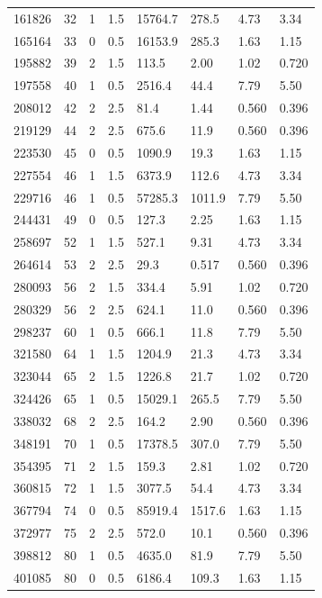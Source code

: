 \documentclass[preview]{standalone}
\begin{document}
{{\begin{tabular}{L{1.2cm}C{1.2cm} C{0.3cm}C{0.5cm} C{1.4cm}C{1.4cm} C{1.4cm}C{1.4cm}}
  161826  &    32  & 1     & 1.5 &  15764.7  & 278.5  & 4.73 &  3.34   \\ 
  165164  &    33  & 0     & 0.5 &  16153.9  & 285.3  & 1.63 &  1.15   \\ 
  195882  &    39  & 2     & 1.5 &  113.5  & 2.00  & 1.02 &  0.720   \\ 
  197558  &    40  & 1     & 0.5 &  2516.4  & 44.4  & 7.79 &  5.50   \\ 
  208012  &    42  & 2     & 2.5 &  81.4  & 1.44  & 0.560 &  0.396   \\ 
  219129  &    44  & 2     & 2.5 &  675.6  & 11.9  & 0.560 &  0.396   \\ 
  223530  &    45  & 0     & 0.5 &  1090.9  & 19.3  & 1.63 &  1.15   \\ 
  227554  &    46  & 1     & 1.5 &  6373.9  & 112.6  & 4.73 &  3.34   \\ 
  229716  &    46  & 1     & 0.5 &  57285.3  & 1011.9  & 7.79 &  5.50   \\ 
  244431  &    49  & 0     & 0.5 &  127.3  & 2.25  & 1.63 &  1.15   \\ 
  258697  &    52  & 1     & 1.5 &  527.1  & 9.31  & 4.73 &  3.34   \\ 
  264614  &    53  & 2     & 2.5 &  29.3  & 0.517  & 0.560 &  0.396   \\ 
  280093  &    56  & 2     & 1.5 &  334.4  & 5.91  & 1.02 &  0.720   \\ 
  280329  &    56  & 2     & 2.5 &  624.1  & 11.0  & 0.560 &  0.396   \\ 
  298237  &    60  & 1     & 0.5 &  666.1  & 11.8  & 7.79 &  5.50   \\ 
  321580  &    64  & 1     & 1.5 &  1204.9  & 21.3  & 4.73 &  3.34   \\ 
  323044  &    65  & 2     & 1.5 &  1226.8  & 21.7  & 1.02 &  0.720   \\ 
  324426  &    65  & 1     & 0.5 &  15029.1  & 265.5  & 7.79 &  5.50   \\ 
  338032  &    68  & 2     & 2.5 &  164.2  & 2.90  & 0.560 &  0.396   \\ 
  348191  &    70  & 1     & 0.5 &  17378.5  & 307.0  & 7.79 &  5.50   \\ 
  354395  &    71  & 2     & 1.5 &  159.3  & 2.81  & 1.02 &  0.720   \\ 
  360815  &    72  & 1     & 1.5 &  3077.5  & 54.4  & 4.73 &  3.34   \\ 
  367794  &    74  & 0     & 0.5 &  85919.4  & 1517.6  & 1.63 &  1.15   \\ 
  372977  &    75  & 2     & 2.5 &  572.0  & 10.1  & 0.560 &  0.396   \\ 
  398812  &    80  & 1     & 0.5 &  4635.0  & 81.9  & 7.79 &  5.50   \\ 
  401085  &    80  & 0     & 0.5 &  6186.4  & 109.3  & 1.63 &  1.15   \\ 
\hline 
\end{tabular} 

}}
\end{document}
